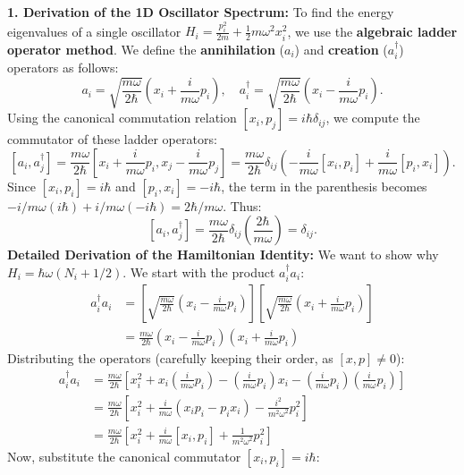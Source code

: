 \begin{solution}
\textbf{1. Derivation of the 1D Oscillator Spectrum:}
To find the energy eigenvalues of a single oscillator $H_i = \frac{p_i^2}{2m} + \frac{1}{2}m\omega^2 x_i^2$, we use the \textbf{algebraic ladder operator method}. We define the \textbf{annihilation} ($a_i$) and \textbf{creation} ($a_i^\dagger$) operators as follows:
\[ a_i = \sqrt{\frac{m\omega}{2\hbar}} \left( x_i + \frac{i}{m\omega} p_i \right), \quad a_i^\dagger = \sqrt{\frac{m\omega}{2\hbar}} \left( x_i - \frac{i}{m\omega} p_i \right). \]
Using the canonical commutation relation $[x_i, p_j] = i\hbar \delta_{ij}$, we compute the commutator of these ladder operators:
\[ [a_i, a_j^\dagger] = \frac{m\omega}{2\hbar} [x_i + \frac{i}{m\omega} p_i, x_j - \frac{i}{m\omega} p_j] = \frac{m\omega}{2\hbar} \delta_{ij} \left( -\frac{i}{m\omega}[x_i, p_i] + \frac{i}{m\omega}[p_i, x_i] \right). \]
Since $[x_i, p_i] = i\hbar$ and $[p_i, x_i] = -i\hbar$, the term in the parenthesis becomes $-i/m\omega(i\hbar) + i/m\omega(-i\hbar) = 2\hbar/m\omega$. Thus:
\[ [a_i, a_j^\dagger] = \frac{m\omega}{2\hbar} \delta_{ij} \left( \frac{2\hbar}{m\omega} \right) = \delta_{ij}. \]
\textbf{Detailed Derivation of the Hamiltonian Identity:}
We want to show why $H_i = \hbar\omega (N_i + 1/2)$. We start with the product $a_i^\dagger a_i$:
\[ \begin{aligned}
a_i^\dagger a_i &= \left[ \sqrt{\frac{m\omega}{2\hbar}} \left( x_i - \frac{i}{m\omega} p_i \right) \right] \left[ \sqrt{\frac{m\omega}{2\hbar}} \left( x_i + \frac{i}{m\omega} p_i \right) \right] \\
&= \frac{m\omega}{2\hbar} \left( x_i - \frac{i}{m\omega} p_i \right) \left( x_i + \frac{i}{m\omega} p_i \right)
\end{aligned} \]
Distributing the operators (carefully keeping their order, as $[x, p] \neq 0$):
\[ \begin{aligned}
a_i^\dagger a_i &= \frac{m\omega}{2\hbar} \left[ x_i^2 + x_i \left( \frac{i}{m\omega} p_i \right) - \left( \frac{i}{m\omega} p_i \right) x_i - \left( \frac{i}{m\omega} p_i \right) \left( \frac{i}{m\omega} p_i \right) \right] \\
&= \frac{m\omega}{2\hbar} \left[ x_i^2 + \frac{i}{m\omega} (x_i p_i - p_i x_i) - \frac{i^2}{m^2\omega^2} p_i^2 \right] \\
&= \frac{m\omega}{2\hbar} \left[ x_i^2 + \frac{i}{m\omega} [x_i, p_i] + \frac{1}{m^2\omega^2} p_i^2 \right]
\end{aligned} \]
Now, substitute the canonical commutator $[x_i, p_i] = i\hbar$:
\[ \begin{aligned}

\end{aligned}\]
\end{solution}
